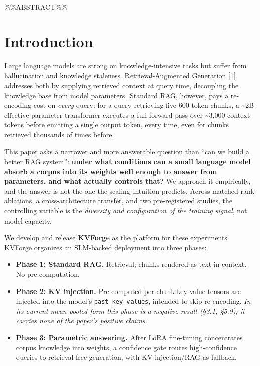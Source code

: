 \%\%ABSTRACT\%\%

\hypertarget{introduction}{%
\section{Introduction}\label{introduction}}

Large language models are strong on knowledge-intensive tasks but suffer from hallucination and knowledge staleness. Retrieval-Augmented Generation {[}1{]} addresses both by supplying retrieved context at query time, decoupling the knowledge base from model parameters. Standard RAG, however, pays a re-encoding cost on \emph{every} query: for a query retrieving five 600-token chunks, a \textasciitilde2B-effective-parameter transformer executes a full forward pass over \textasciitilde3,000 context tokens before emitting a single output token, every time, even for chunks retrieved thousands of times before.

This paper asks a narrower and more answerable question than ``can we build a better RAG system'': \textbf{under what conditions can a small language model absorb a corpus into its weights well enough to answer from parameters, and what actually controls that?} We approach it empirically, and the answer is not the one the scaling intuition predicts. Across matched-rank ablations, a cross-architecture transfer, and two pre-registered studies, the controlling variable is the \emph{diversity and configuration of the training signal}, not model capacity.

We develop and release \textbf{KVForge} as the platform for these experiments. KVForge organizes an SLM-backed deployment into three phases:

\begin{itemize}
\tightlist
\item
  \textbf{Phase 1: Standard RAG.} Retrieval; chunks rendered as text in context. No pre-computation.
\item
  \textbf{Phase 2: KV injection.} Pre-computed per-chunk key-value tensors are injected into the model's \texttt{past\_key\_values}, intended to skip re-encoding. \emph{In its current mean-pooled form this phase is a negative result (§3.1, §5.9); it carries none of the paper's positive claims.}
\item
  \textbf{Phase 3: Parametric answering.} After LoRA fine-tuning concentrates corpus knowledge into weights, a confidence gate routes high-confidence queries to retrieval-free generation, with KV-injection/RAG as fallback.
\end{itemize}

